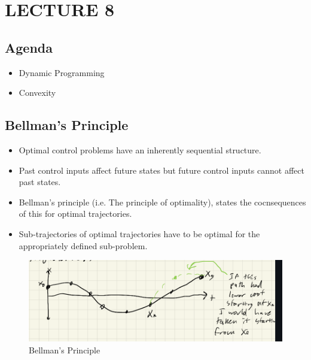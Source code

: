 \newpage
\section{LECTURE 8}

\subsection{Agenda}
\begin{itemize}
    \item Dynamic Programming
    \item Convexity
\end{itemize}

\subsection{Bellman's Principle}
\begin{itemize}
    \item Optimal control problems have an inherently sequential structure. 
    \item Past control inputs affect future states but future control inputs cannot affect past states. 
    \item Bellman's principle (i.e. The principle of optimality), states the cocnsequences of this for optimal trajectories. 
    \item Sub-trajectories of optimal trajectories have to be optimal for the appropriately defined sub-problem.
\end{itemize}

\begin{figure}
    \centering
    \includegraphics[width=0.4\linewidth]{L8_Images/F1.PNG}
    \caption{Bellman's Principle}
    \label{fig:l8f1}
\end{figure}

